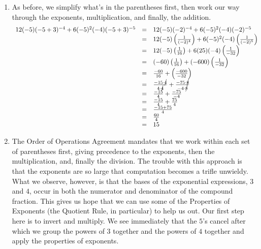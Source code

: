 \documentclass{ximera}
\begin{document}
\begin{example}
\begin{enumerate}
\item  As before, we simplify what's in the parentheses first, then work our way through the exponents, multiplication, and finally, the addition.\[ \begin{array}{rclr}

12(-5)(-5+3)^{-4}+6(-5)^2(-4)(-5+3)^{-5} & = & 12(-5)(-2)^{-4} + 6(-5)^{2}(-4)(-2)^{-5} \\  
                                         & = & 12(-5)\left(\frac{1}{(-2)^4}\right) + 6(-5)^{2}(-4)\left(\frac{1}{(-2)^5}\right)& \\  
                                        
                                         & = & 12(-5)\left(\frac{1}{16}\right) + 6(25)(-4)\left(\frac{1}{-32}\right)& \\  
																				
																				& = & (-60)\left(\frac{1}{16}\right) + (-600)\left(\frac{1}{-32}\right)& \\  

	& = & \frac{-60}{16} + \left(\frac{-600}{-32}\right)&  \\  
		& = & \frac{-15\cdot \cancel{4}}{4 \cdot \cancel{4}} + \frac{-75 \cdot \cancel{8}}{-4 \cdot \cancel{8}} & \\  
		& = & \frac{-15}{4} + \frac{-75}{-4} & \\  
			& = & \frac{-15}{4} + \frac{75}{4} & \\  
				& = & \frac{-15 + 75}{4} & \\  
				& = & \frac{60}{4} & \\  
	       & = & 15 & \\  \end{array}\]
				
\item  The Order of Operations Agreement mandates that we work within each set of parentheses first, giving precedence to the exponents, then the multiplication, and, finally the division.  The trouble with this approach is that the exponents are so large that computation becomes a trifle unwieldy.   What we observe, however, is that the bases of the exponential expressions, $3$ and $4$, occur in both the numerator and denominator of the compound fraction.  This gives us hope that we can use some of the Properties of Exponents (the Quotient Rule, in particular) to help us out. Our first step here is to invert and multiply.  We see immediately that the $5$'s cancel after which we group the powers of $3$ together and the powers of $4$ together and apply the properties of exponents.\[ \begin{array}{rclclcl}


\end{array}\]
\end{enumerate}
\end{example}
\end{document}
